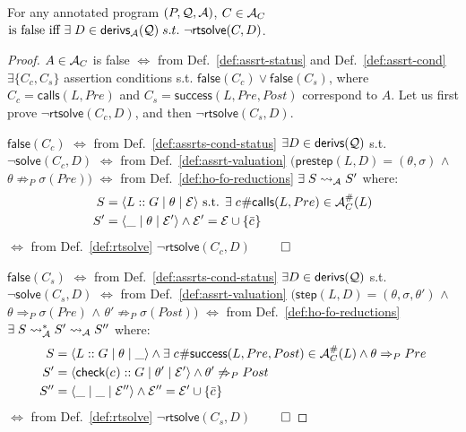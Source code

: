 \documentclass{llncs}
\newcommand{\Q}{\ensuremath{{\cal Q}}}
\newcommand{\A}
  {\ensuremath{{\cal A}}}
\newcommand{\AC}
  {\ensuremath{{\cal A}_{C}}}
\newcommand{\LabAClit}[1]
  {\ensuremath{\AC^{\#}(#1)}}
\newcommand{\gd}[0]{\mid}
\newcommand{\exstate}[3]
  {\ensuremath{\langle #1 \gd{} #2 \gd{} #3 \rangle}}
\newcommand{\ADeps}{\ensuremath{{\cal E}}}
\newcommand{\reductionA}[2]
  {\ensuremath{#1 \leadsto_{\A} #2}}
\newcommand{\reductionStarA}[2]
  {\ensuremath{#1 \leadsto^*_{\A} #2}}
\newcommand{\derivations}[1]
  {\ensuremath{\textsf{derivs}(#1)}}
\newcommand{\derivationsA}[1]
  {\ensuremath{\textsf{derivs}_{\A}(#1)}}
\newcommand{\asrId}[1]{\ensuremath{c_{#1}}}
\newcommand{\negAsrId}[1]{\ensuremath{\bar{c}_{#1}}}
\newcommand{\falseAsr}[1]{\ensuremath{\textsf{false}(#1)}}
\newcommand{\checkLitLab}[1]{\ensuremath{\textsf{check}(#1)}}
\newcommand{\callsAsr}[2]{\ensuremath{\textsf{calls}(#1, #2)}}
\newcommand{\successAsr}[3]{\ensuremath{\textsf{success}(#1, #2, #3)}}
\newcommand{\labCallsAsr}[3]
  {\ensuremath{\textsf{\asrId{#1}\#calls}(#2, #3)}}
\newcommand{\labSuccessAsr}[4]
  {\ensuremath{\textsf{\asrId{#1}\#success}(#2, #3, #4)}}
\begin{document}
\begin{theorem}
  \label{thm:rtcheck}
  For any annotated program $(P,\Q,\A)$, 
    $C \in \AC $ $\mbox{is false  iff } 
    \exists\; D \in \derivationsA{\Q} \; s.t.~ \neg\textsf{rtsolve}(C,D)$.
\end{theorem}

\begin{proof}
  $A \in \AC$ is false
\newline
  $\Leftrightarrow$
  from Def.~\ref{def:assrt-status} and Def.~\ref{def:assrt-cond}
  $\exists \{C_c,C_s\}$ assertion conditions s.t. 
  $\falseAsr{C_c} \vee \falseAsr{C_s}$, where
  $C_c = \callsAsr{L}{Pre}$ and
  $C_s = \successAsr{L}{Pre}{Post}$ correspond to $A$. Let us first
  prove $\neg\textsf{rtsolve}(C_c,D)$, and then 
  $\neg\textsf{rtsolve}(C_s,D)$. 

\hfill\newline
  $\falseAsr{C_c}$
\newline
  $\Leftrightarrow$
  from Def.~\ref{def:assrts-cond-status} 
  $\exists D \in \derivations{\Q}$ s.t. 
  $\neg\textsf{solve}(C_c,D)$
\newline
  $\Leftrightarrow$
  from Def.~\ref{def:assrt-valuation}
  $(\textsf{prestep}(L,D)=(\theta,\sigma)$ $\wedge$
  $\theta\not\Rightarrow_P\sigma(Pre))$
\newline
  $\Leftrightarrow$
  from Def.~\ref{def:ho-fo-reductions} 
  $\exists\; \reductionA{S}{S'}$ where:
\begin{align*}
  S 
  &= \exstate{L :: G}{\theta}{\ADeps} \text{ s.t. }
    \exists\; \labCallsAsr{}{L}{Pre} \in \LabAClit{L}
  \\
  S' 
  &= \exstate{\_}{\theta}{\ADeps'} \wedge 
    \ADeps' = \ADeps \cup \{\negAsrId{}\}
\end{align*}
  $\Leftrightarrow$
  from Def.~\ref{def:rtsolve} 
  $\neg\textsf{rtsolve}(C_c,D)$
\hfill $\qed$

\hfill\newline
  $\falseAsr{C_s}$
\newline
  $\Leftrightarrow$
  from Def.~\ref{def:assrts-cond-status} 
  $\exists D \in \derivations{\Q}$ s.t. 
  $\neg \textsf{solve}(C_s,D)$
\newline
  $\Leftrightarrow$
  from Def.~\ref{def:assrt-valuation}
  $(\textsf{step}(L,D)=(\theta,\sigma,\theta')$ $\wedge$
  $ \theta \Rightarrow_P \sigma(Pre)$ $\wedge$
  $ \theta' \not\Rightarrow_P \sigma(Post))$
\newline
  $\Leftrightarrow$
  from Def.~\ref{def:ho-fo-reductions} 
   $\exists\; 
  \reductionA{\reductionStarA{S}{S'}}{S''}$ where:
\begin{align*}
  S 
  &= \exstate{L::G}{\theta}{\_} \wedge
    \exists\; \labSuccessAsr{}{L}{Pre}{Post} \in \LabAClit{L}
    \wedge \theta \Rightarrow_P Pre
  \\
  S' 
  &= \exstate{\checkLitLab{\asrId{}}::G}{\theta'}{\ADeps'}
    \wedge \theta' \not\Rightarrow_P Post
  \\
  S'' 
  &= \exstate{\_}{\_}{\ADeps''} \wedge
    \ADeps'' = \ADeps' \cup \{\negAsrId{}\}
\end{align*}
  $\Leftrightarrow$
  from Def.~\ref{def:rtsolve} 
  $\neg\textsf{rtsolve}(C_s,D)$
\hfill $\qed$
\end{proof}
\end{document}
